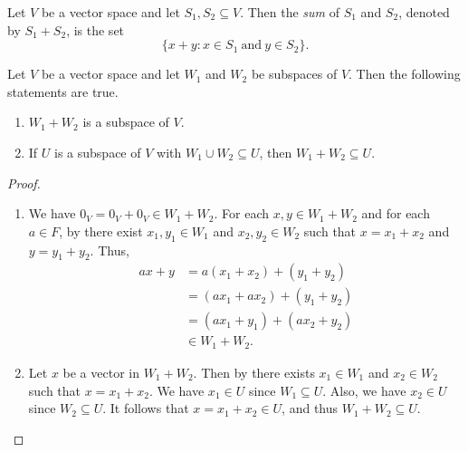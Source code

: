 \begin{definition}\label{def:sum}
  Let $V$ be a vector space and let $S_1, S_2 \subseteq V$.
  Then the \emph{sum} of $S_1$ and $S_2$, denoted by $S_1 + S_2$, is the set
  \begin{equation*}
    \{x + y: x \in S_1\ \text{and}\ y \in S_2\}.
  \end{equation*}
\end{definition}

\begin{proposition}\label{prop:subspace-sum}
  Let $V$ be a vector space and let $W_1$ and $W_2$ be subspaces of $V$.
  Then the following statements are true.
  \begin{enumerate}
    \item $W_1 + W_2$ is a subspace of $V$.
    \item If $U$ is a subspace of $V$ with $W_1 \cup W_2 \subseteq U$,
      then $W_1 + W_2 \subseteq U$.
  \end{enumerate}
\end{proposition}
\begin{proof} \leavevmode
  \begin{enumerate}
    \item We have $0_V = 0_V + 0_V \in W_1 + W_2$.
      For each $x, y \in W_1 + W_2$ and for each $a \in F$, by 
      there exist $x_1, y_1 \in W_1$ and $x_2, y_2 \in W_2$ such that
      $x = x_1 + x_2$ and $y = y_1 + y_2$.
      Thus,
      \begin{align*}
        ax + y
        &= a(x_1 + x_2) + (y_1 + y_2) \\
        &= (ax_1 + ax_2) + (y_1 + y_2) \\
        &= (ax_1 + y_1) + (ax_2 + y_2) \\
        &\in W_1 + W_2.
      \end{align*}
    \item Let $x$ be a vector in $W_1 + W_2$.
      Then by  there exists $x_1 \in W_1$ and $x_2 \in W_2$ such
      that $x = x_1 + x_2$.
      We have $x_1 \in U$ since $W_1 \subseteq U$.
      Also, we have $x_2 \in U$ since $W_2 \subseteq U$.
      It follows that $x = x_1 + x_2 \in U$, and thus $W_1 + W_2 \subseteq U$.
      \qedhere
  \end{enumerate}
\end{proof}

